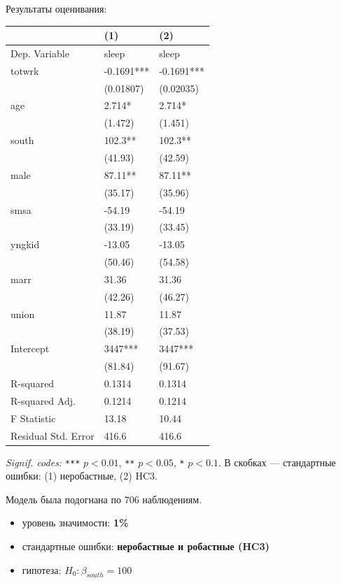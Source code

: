 \documentclass[
  russian,
]{article}
\newcounter{none} %
\providecommand{\tightlist}{%
  \setlength{\itemsep}{0pt}\setlength{\parskip}{0pt}}
\begin{document}
Результаты оценивания:

{\def\LTcaptype{none} %
\begin{longtable}[]{@{}lll@{}}
\toprule\noalign{}
& (1) & (2) \\
\midrule\noalign{}
\endhead
\bottomrule\noalign{}
\endlastfoot
Dep. Variable & sleep & sleep \\
totwrk & -0.1691*** & -0.1691*** \\
& (0.01807) & (0.02035) \\
age & 2.714* & 2.714* \\
& (1.472) & (1.451) \\
south & 102.3** & 102.3** \\
& (41.93) & (42.59) \\
male & 87.11** & 87.11** \\
& (35.17) & (35.96) \\
smsa & -54.19 & -54.19 \\
& (33.19) & (33.45) \\
yngkid & -13.05 & -13.05 \\
& (50.46) & (54.58) \\
marr & 31.36 & 31.36 \\
& (42.26) & (46.27) \\
union & 11.87 & 11.87 \\
& (38.19) & (37.53) \\
Intercept & 3447*** & 3447*** \\
& (81.84) & (91.67) \\
R-squared & 0.1314 & 0.1314 \\
R-squared Adj. & 0.1214 & 0.1214 \\
F Statistic & 13.18 & 10.44 \\
Residual Std. Error & 416.6 & 416.6 \\
\end{longtable}
}

\emph{Signif. codes:} \texttt{***} \(p<0.01\), \texttt{**} \(p<0.05\),
\texttt{*} \(p<0.1\). В скобках --- стандартные ошибки: (1) неробастные,
(2) HC3.

Модель была подогнана по 706 наблюдениям.

\begin{tcolorbox}[enhanced jigsaw, arc=.35mm, bottomrule=.15mm, bottomtitle=1mm, breakable, colback=white, colbacktitle=quarto-callout-important-color!10!white, colframe=quarto-callout-important-color-frame, coltitle=black, left=2mm, leftrule=.75mm, opacityback=0, opacitybacktitle=0.6, rightrule=.15mm, title=\textcolor{quarto-callout-important-color}{\faExclamation}\hspace{0.5em}{Условия теста}, titlerule=0mm, toprule=.15mm, toptitle=1mm]

\begin{itemize}
\tightlist
\item
  уровень значимости: \textbf{1\%}
\item
  стандартные ошибки: \textbf{неробастные и робастные (HC3)}
\item
  гипотеза: \(H_0:\beta_{south}=100\)
\end{itemize}

\end{tcolorbox}
\end{document}
